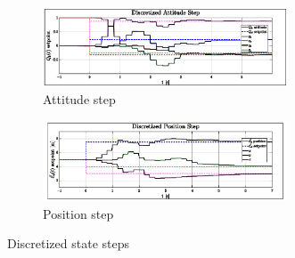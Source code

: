 \begin{figure}[htbp]
\centering
\begin{subfigure}{\textwidth}
\centering
\includegraphics[width=0.8\textwidth]{graphs/discrete_attitude_step}
\vspace{-12pt}
\caption{Attitude step}
\end{subfigure}
\begin{subfigure}{\textwidth}
\vspace{-3pt}
\centering
\includegraphics[width=0.8\textwidth]{graphs/discrete_position_step}
\vspace{-12pt}
\caption{Position step}
\end{subfigure}
\vspace{-8pt}
\caption{Discretized state steps}
\label{fig:discrete_step}
\vspace{-12pt}
\end{figure}
\par